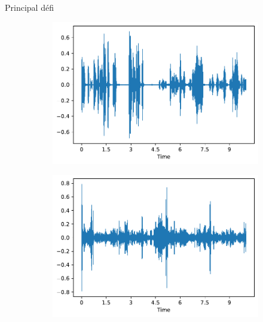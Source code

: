 \documentclass[compress,xcolor=table]{beamer}
\begin{document}
\begin{frame}{Principal défi}
\begin{figure}[ht]
        \vspace{-0.5cm}

        \begin{subfigure}[b]{0.45\textwidth}
            \centering
            \includegraphics[width=\textwidth]{images/audio/birds.wave.ff1010.pdf}
            \label{fig:birds.wave.ff1010}
        \end{subfigure}
        \hfill
        \begin{subfigure}[b]{0.45\textwidth}
            \centering
            \includegraphics[width=\textwidth]{images/audio/nobirds.wave.ff1010.pdf}
            \label{fig:nobirds.wave.ff1010}
        \end{subfigure}
    \end{figure}

\end{frame}
\end{document}
